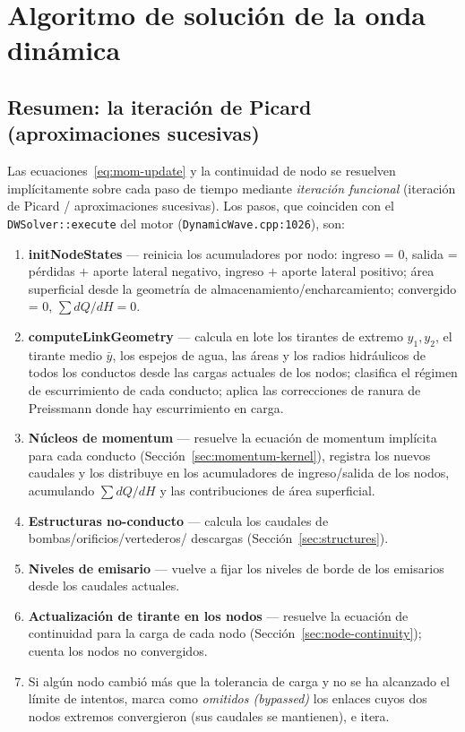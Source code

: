\documentclass[11pt,a4paper]{article}
\begin{document}
\section{Algoritmo de solución de la onda dinámica}

\subsection{Resumen: la iteración de Picard (aproximaciones sucesivas)}

Las ecuaciones~\eqref{eq:mom-update} y la continuidad de nodo se resuelven
implícitamente sobre cada paso de tiempo mediante \emph{iteración funcional}
(iteración de Picard / aproximaciones sucesivas). Los pasos, que coinciden con
el \texttt{DWSolver::execute} del motor (\texttt{DynamicWave.cpp:1026}), son:

\begin{enumerate}[nosep]
  \item \textbf{initNodeStates} --- reinicia los acumuladores por nodo: ingreso
        = 0, salida = pérdidas $+$ aporte lateral negativo, ingreso $+$ aporte
        lateral positivo; área superficial desde la geometría de
        almacenamiento/encharcamiento; convergido = 0, $\sum dQ/dH = 0$.
  \item \textbf{computeLinkGeometry} --- calcula en lote los tirantes de
        extremo $y_1, y_2$, el tirante medio $\bar y$, los espejos de agua, las
        áreas y los radios hidráulicos de todos los conductos desde las cargas
        actuales de los nodos; clasifica el régimen de escurrimiento de cada
        conducto; aplica las correcciones de ranura de Preissmann donde hay
        escurrimiento en carga.
  \item \textbf{Núcleos de momentum} --- resuelve la ecuación de momentum
        implícita para cada conducto (Sección~\ref{sec:momentum-kernel}),
        registra los nuevos caudales y los distribuye en los acumuladores de
        ingreso/salida de los nodos, acumulando $\sum dQ/dH$ y las
        contribuciones de área superficial.
  \item \textbf{Estructuras no-conducto} --- calcula los caudales de
        bombas/\allowbreak orificios/\allowbreak vertederos/\allowbreak
        descargas (Sección~\ref{sec:structures}).
  \item \textbf{Niveles de emisario} --- vuelve a fijar los niveles de borde de
        los emisarios desde los caudales actuales.
  \item \textbf{Actualización de tirante en los nodos} --- resuelve la ecuación
        de continuidad para la carga de cada nodo
        (Sección~\ref{sec:node-continuity}); cuenta los nodos no convergidos.
  \item Si algún nodo cambió más que la tolerancia de carga y no se ha alcanzado
        el límite de intentos, marca como \emph{omitidos (bypassed)} los
        enlaces cuyos dos nodos extremos convergieron (sus caudales se
        mantienen), e itera.
\end{enumerate}
\end{document}
